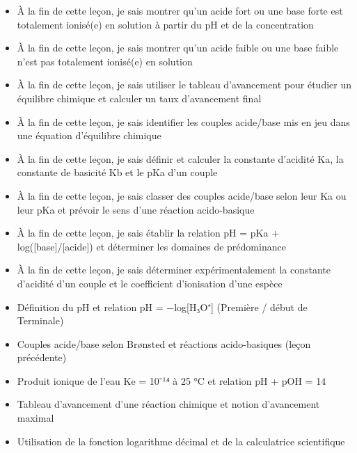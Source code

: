 \documentclass[11pt]{article}
\begin{document}
\begin{objectifs}
\begin{itemize}
\item À la fin de cette leçon, je sais montrer qu'un acide fort ou une base forte est totalement ionisé(e) en solution à partir du pH et de la concentration
\item À la fin de cette leçon, je sais montrer qu'un acide faible ou une base faible n'est pas totalement ionisé(e) en solution
\item À la fin de cette leçon, je sais utiliser le tableau d'avancement pour étudier un équilibre chimique et calculer un taux d'avancement final
\item À la fin de cette leçon, je sais identifier les couples acide/base mis en jeu dans une équation d'équilibre chimique
\item À la fin de cette leçon, je sais définir et calculer la constante d'acidité Ka, la constante de basicité Kb et le pKa d'un couple
\item À la fin de cette leçon, je sais classer des couples acide/base selon leur Ka ou leur pKa et prévoir le sens d'une réaction acido-basique
\item À la fin de cette leçon, je sais établir la relation pH = pKa + log([base]/[acide]) et déterminer les domaines de prédominance
\item À la fin de cette leçon, je sais déterminer expérimentalement la constante d'acidité d'un couple et le coefficient d'ionisation d'une espèce
\end{itemize}
\end{objectifs}

\begin{prerequis}
\begin{itemize}
\item Définition du pH et relation pH = −log[H₃O⁺] (Première / début de Terminale)
\item Couples acide/base selon Brønsted et réactions acido-basiques (leçon précédente)
\item Produit ionique de l'eau Ke = 10⁻¹⁴ à 25 °C et relation pH + pOH = 14
\item Tableau d'avancement d'une réaction chimique et notion d'avancement maximal
\item Utilisation de la fonction logarithme décimal et de la calculatrice scientifique
\end{itemize}
\end{prerequis}

\newpage
\end{document}
